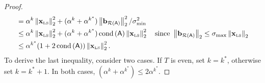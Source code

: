 \begin{proof}
\begin{align*}
									&   =   \alpha^k \norm{\xls}^2 + (\alpha^{k}+\alpha^{k^*}) \norm{\br}^2/\sigma_{\min}^2\\
									&   \leq   \alpha^k \norm{\xls}^2 + (\alpha^{k}+\alpha^{k^*}) \cond{\matA} \norm{\xls}^2 \quad \text{since }\norm{\br} \leq \sigma_{\max} \norm{\xls} \\
									&   \leq \alpha^{k^*} (1 + 2\cond{\matA})\norm{\xls}^2.
\end{align*}
To derive the last inequality, consider two cases. If $T$ is even, set $k=k^*$, otherwise set $k=k^*+1$. In both cases, $(\alpha^{k}+\alpha^{k^*}) \leq 2\alpha^{k^*}$.
%
\end{proof}
%
